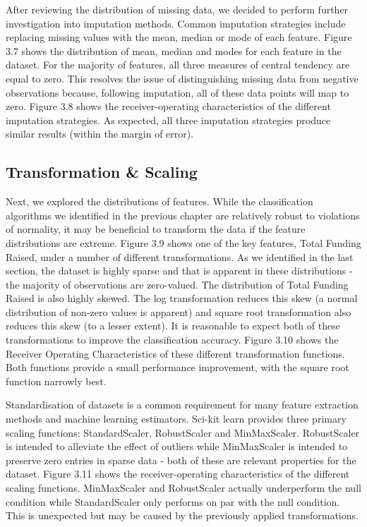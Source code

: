 \documentclass[../thesis/thesis.tex]{subfiles}
\begin{document}
\begin{enumerate}
After reviewing the distribution of missing data, we decided to perform further investigation into imputation methods. Common imputation strategies include replacing missing values with the mean, median or mode of each feature. Figure 3.7 shows the distribution of mean, median and modes for each feature in the dataset. For the majority of features, all three measures of central tendency are equal to zero. This resolves the issue of distinguishing missing data from negative observations because, following imputation, all of these data points will map to zero. Figure 3.8 shows the receiver-operating characteristics of the different imputation strategies. As expected, all three imputation strategies produce similar results (within the margin of error).

\subsection{Transformation \& Scaling}

Next, we explored the distributions of features. While the classification algorithms we identified in the previous chapter are relatively robust to violations of normality, it may be beneficial to transform the data if the feature distributions are extreme. Figure 3.9 shows one of the key features, Total Funding Raised, under a number of different transformations. As we identified in the last section, the dataset is highly sparse and that is apparent in these distributions - the majority of observations are zero-valued. The distribution of Total Funding Raised is also highly skewed. The log transformation reduces this skew (a normal distribution of non-zero values is apparent) and square root transformation also reduces this skew (to a lesser extent). It is reasonable to expect both of these transformations to improve the classification accuracy. Figure 3.10 shows the Receiver Operating Characteristics of these different transformation functions. Both functions provide a small performance improvement, with the square root function narrowly best.

Standardisation of datasets is a common requirement for many feature extraction methods and machine learning estimators. Sci-kit learn provides three primary scaling functions: StandardScaler, RobustScaler and MinMaxScaler. RobustScaler is intended to alleviate the effect of outliers while MinMaxScaler is intended to preserve zero entries in sparse data - both of these are relevant properties for the dataset. Figure 3.11 shows the receiver-operating characteristics of the different scaling functions. MinMaxScaler and RobustScaler actually underperform the null condition while StandardScaler only performs on par with the null condition. This is unexpected but may be caused by the previously applied transformations.


\end{enumerate}
\end{document}
